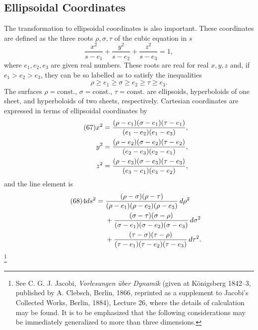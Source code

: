 \subsection{Ellipsoidal Coordinates}
The transformation to ellipsoidal coordinates is also important. These coordinates are defined as the three roots $\rho,\sigma,\tau$ of the cubic equation in $s$
\begin{equation}\tag{66}
\frac{x^2}{s-e_1}+\frac{y^2}{s-e_2}+\frac{z^2}{s-e_3}=1,
\end{equation}
where $e_1,e_2,e_3$ are given real numbers. These roots are real for real $x,y,z$ and, if $e_1>e_2>e_3$, they can be so labelled as to satisfy the inequalities
\[
\rho\ge e_1\ge\sigma\ge e_2\ge\tau\ge e_3.
\]
The surfaces $\rho=\text{const.}$, $\sigma=\text{const.}$, $\tau=\text{const.}$ are ellipsoids, hyperboloids of one sheet, and hyperboloids of two sheets, respectively. Cartesian coordinates are expressed in terms of ellipsoidal coordinates by
\begin{align}\tag{67}
x^2&=\frac{(\rho-e_1)(\sigma-e_1)(\tau-e_1)}{(e_1-e_2)(e_1-e_3)},\notag\\
y^2&=\frac{(\rho-e_2)(\sigma-e_2)(\tau-e_2)}{(e_2-e_3)(e_2-e_1)},\notag\\
z^2&=\frac{(\rho-e_3)(\sigma-e_3)(\tau-e_3)}{(e_3-e_1)(e_3-e_2)},
\end{align}
and the line element is
\begin{align}\tag{68}
4ds^2={}&\frac{(\rho-\sigma)(\rho-\tau)}{(\rho-e_1)(\rho-e_2)(\rho-e_3)}\,d\rho^2\notag\\
&+\frac{(\sigma-\tau)(\sigma-\rho)}{(\sigma-e_1)(\sigma-e_2)(\sigma-e_3)}\,d\sigma^2\notag\\
&+\frac{(\tau-\sigma)(\tau-\rho)}{(\tau-e_1)(\tau-e_2)(\tau-e_3)}\,d\tau^2.
\end{align}
\footnote{See C. G. J. Jacobi, \emph{Vorlesungen \"uber Dynamik} (given at K\"onigsberg 1842--3, published by A. Clebsch, Berlin, 1866, reprinted as a supplement to Jacobi's Collected Works, Berlin, 1884), Lecture 26, where the details of calculation may be found. It is to be emphasized that the following considerations may be immediately generalized to more than three dimensions.}

